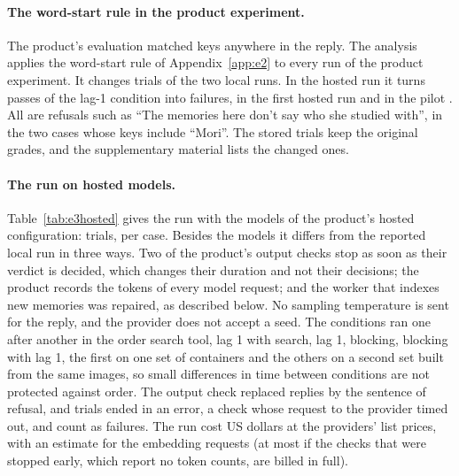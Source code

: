 \documentclass[10pt]{article}
\begin{document}
\paragraph{The word-start rule in the product experiment.} The product's evaluation matched keys anywhere in the reply. The analysis applies the word-start rule of Appendix~\ref{app:e2} to every run of the product experiment. It changes \KRegraded{} trials of the two local runs. In the hosted run it turns \KHRegraded{} passes of the lag-1 condition into failures, in the first hosted run \KHFirstRegraded{} and in the pilot \KPilotRegraded{}. All are refusals such as ``The memories here don't say who she studied with'', in the two cases whose keys include ``Mori''. The stored trials keep the original grades, and the supplementary material lists the changed ones.

\paragraph{The run on hosted models.} Table~\ref{tab:e3hosted} gives the run with the models of the product's hosted configuration: \KHTrials{} trials, \KHTrialsPerCase{} per case. Besides the models it differs from the reported local run in three ways. Two of the product's output checks stop as soon as their verdict is decided, which changes their duration and not their decisions; the product records the tokens of every model request; and the worker that indexes new memories was repaired, as described below. No sampling temperature is sent for the reply, and the provider does not accept a seed. The conditions ran one after another in the order search tool, lag 1 with search, lag 1, blocking, blocking with lag 1, the first on one set of containers and the others on a second set built from the same images, so small differences in time between conditions are not protected against order. The output check replaced \KHTemplated{} replies by the sentence of refusal, and \KHErrors{} trials ended in an error, a check whose request to the provider timed out, and count as failures. The run cost \KHCostRun{} US dollars at the providers' list prices, with an estimate for the embedding requests (at most \KHCostRunUpper{} if the checks that were stopped early, which report no token counts, are billed in full).
\end{document}
